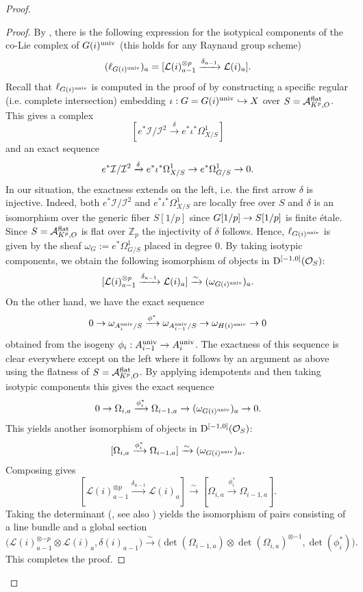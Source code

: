 \documentclass[reqno, 10pt]{amsart}
\makeatletter
\newcommand{\BZ}{\ensuremath{\mathbb {Z}}\xspace}
\newcommand{\CA}{\ensuremath{\mathcal {A}}\xspace}
\newcommand{\CI}{\ensuremath{\mathcal {I}}\xspace}
\newcommand{\CL}{\ensuremath{\mathcal {L}}\xspace}
\newcommand{\CO}{\ensuremath{\mathcal {O}}\xspace}
\theoremstyle{definition}
\numberwithin{equation}{subsection}
\numberwithin{subsubsection}{subsection}
\renewcommand{\to}{%
   \ifbool{@display}{\longrightarrow}{\rightarrow}%
   }
\makeatother
\begin{document}
\begin{proof}
\begin{proof} By \cite[Lem. 4.1]{SLiu}, there is the following expression for the  isotypical components of the co-Lie complex of $G(i)^{\rm univ}$ (this holds for any Raynaud group scheme)
\[
(\ell_{G(i)^{\rm univ}})_a=[\CL(i)_{a-1}^{\otimes p}\xrightarrow{\delta_{a-1}} \CL(i)_a].
\]
Recall that $\ell_{G(i)^{\rm univ}}$ is computed in the proof of \cite[Lem. 4.1]{SLiu} by constructing a specific regular (i.e. complete intersection) embedding $\iota: G=G(i)^{\rm univ}\hookrightarrow X$ over $S=\CA^{\rm flat}_{K^p, O}$. This gives a complex
\[
[e^*\CI/\CI^2\xrightarrow{\delta} e^*\iota^*\Omega^1_{X/S}]
\]
and an exact sequence
\[
e^*\CI/\CI^2\xrightarrow{\delta} e^*\iota^*\Omega^1_{X/S}\to e^*\Omega^1_{G/S}\to 0.
\]
In our situation, the exactness extends on the left, i.e. the first arrow $\delta$ is injective. Indeed, both $e^*\CI/\CI^2$ and
$e^*\iota^*\Omega^1_{X/S}$  are locally free over $S$ and $\delta$ is an isomorphism over the 
generic fiber $S[1/p]$ since $G[1/p]\to S[1/p]$ is finite \'etale. Since $S=\CA^{\rm flat}_{K^p, O}$ is flat over $\BZ_p$
the injectivity of $\delta$ follows. Hence, $\ell_{G(i)^{\rm univ}}$ is given by the sheaf $\omega_G:=e^*\Omega^1_{G/S}$ 
placed in degree $0$. By taking isotypic components, we obtain
the following isomorphism of objects in ${\rm D}^{[-1,0]}(\CO_S)$:
\[
[\CL(i)_{a-1}^{\otimes p}\xrightarrow{\delta_{a-1}} \CL(i)_a] \xrightarrow{\sim} (\omega_{G(i)^{\rm univ}} )_a.
\]
On the other hand,  we have the exact sequence 
\[
0\to \omega_{A^{\rm univ}_i/S}\xrightarrow{\phi^*}\omega_{A^{\rm univ}_{i-1}/S}\to \omega_{H(i)^{\rm univ}}\to 0
\]
obtained from the isogeny $\phi_i: A^{\rm univ}_{i-1}\to A_i^{\rm univ}$. The exactness of this sequence is clear everywhere except on the left where it follows by an argument as above
using the flatness of $S=\CA^{\rm flat}_{K^p, O}$. By applying idempotents and then taking isotypic components this gives the exact sequence 
\[
0\to \Omega_{i,a} \xrightarrow{\phi^*_i} \Omega_{i-1,a}\to (\omega_{G(i)^{\rm univ}})_a\to 0.
\]
 This yields another isomorphism of objects in ${\rm D}^{[-1,0]}(\CO_S)$:
\[
[\Omega_{i,a} \xrightarrow{\phi^*_i} \Omega_{i-1,a}] \xrightarrow{\sim} (\omega_{G(i)^{\rm univ}})_a.
\]
Composing gives
\[
[\CL(i)_{a-1}^{\otimes p}\xrightarrow{\delta_{a-1}} \CL(i)_a] \xrightarrow{\sim} [\Omega_{i,a} \xrightarrow{\phi^*_i} \Omega_{i-1,a}]. 
\]
Taking the determinant (\cite{KnM}, see also \cite[5A]{SLiu})  yields the isomorphism  of pairs consisting of a line bundle and a global section
\[
\big(\CL(i)_{a-1}^{\otimes{-p}}\otimes\CL(i)_a, \delta(i)_{a-1}\big)\xrightarrow{\sim} \big(\det(\Omega_{i-1,a})\otimes\det(\Omega_{i,a})^{\otimes{-1}}, \det(\phi^*_i)\big).
\]
This completes the proof.
\end{proof}



\end{proof}
\end{document}
